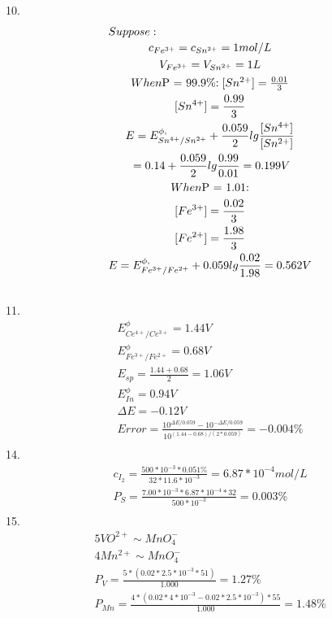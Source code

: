 \documentclass{article}
\begin{document}
10.\begin{equation}
    \begin{multlined}
        Suppose:\\
        c_{Fe^{3+}} = c_{Sn^{2+}} = 1 mol/L\\
        V_{Fe^{3+}} = V_{Sn^{2+}} = 1 L\\
        When $P = 99.9\%$:
        [Sn^{2+}] = \frac{0.01}{3}\\
        [Sn^{4+}] = \frac{0.99}{3}\\
        E = E^{\phi,}_{Sn^{4+}/Sn^{2+}} + \frac{0.059}{2}lg\frac{[Sn^{4+}]}{[Sn^{2+}]}\\
        = 0.14 + \frac{0.059}{2}lg\frac{0.99}{0.01} = 0.199 V\\
        When $P = 1.01$:\\
        [Fe^{3+}] = \frac{0.02}{3}\\
        [Fe^{2+}] = \frac{1.98}{3}\\
        E = E^{\phi,}_{Fe^{3+}/Fe^{2+}} + 0.059lg\frac{0.02}{1.98} = 0.562 V\\
    \end{multlined}
\end{equation}
11.\begin{equation}
    \begin{multlined}
        E^{\phi}_{Ce^{4+}/Ce^{3+}} = 1.44V\\
        E^{\phi}_{Fe^{3+}/Fe^{2+}} = 0.68V\\
        E_{sp} = \frac{1.44 + 0.68}{2} = 1.06V\\
        E^{\phi}_{In} = 0.94V\\
        \Delta E = -0.12V\\
        Error = \frac{10^{\Delta E/0.059} - 10^{-\Delta E/0.059}}{10^{(1.44 - 0.68)/(2*0.059)}} = -0.004\%\\
    \end{multlined}
\end{equation}
14.\begin{equation}
    \begin{multlined}
        c_{I_2} = \frac{500*10^{-3}*0.051\%}{32*11.6*10^{-3}} = 6.87*10^{-4}mol/L\\
        P_S = \frac{7.00*10^{-3}*6.87*10^{-4}*32}{500*10^{-3}} = 0.003\%\\
    \end{multlined}
\end{equation}
15.\begin{equation}
    \begin{multlined}
        5VO^{2+} \sim MnO_4^-\\
        4Mn^{2+} \sim MnO_4^-\\
        P_V = \frac{5*(0.02*2.5*10^{-3}*51)}{1.000} = 1.27\%\\
        P_{Mn} = \frac{4*(0.02*4*10^{-3} - 0.02*2.5*10^{-3})*55}{1.000} = 1.48\%\\
    \end{multlined}
\end{equation}
\end{document}
